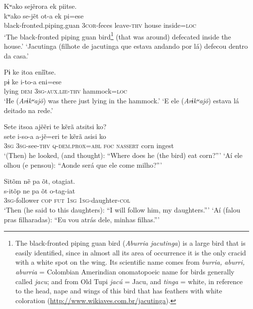 \documentclass[output=paper,
modfonts,nonflat
]{langsci/langscibook}
\begin{document}
 
\newpage
\ea Kʷako sejẽrora ek piitse.\\[.3em]
\gll kʷako se-jẽt ot-a ek pi=ese\\
     black-fronted.piping.guan \textsc{3cor}-feces leave-\textsc{thv} house inside=\textsc{loc}\\
\glt ‘The black-fronted piping guan bird\footnote{The black-fronted piping guan bird (\textit{Aburria jacutinga}) is a large bird that is easily identified, since in almost all its area of occurrence it is the only cracid with a white spot on the wing. Its scientific name comes from \textit{burria, aburri, aburria} = Colombian Amerindian onomatopoeic name for birds generally called \textit{jacu}; and from Old Tupi \textit{jacú} = Jacu, and \textit{tinga} = white, in reference to the head, nape and wings of this bird that has feathers with white coloration (\url{http://www.wikiaves.com.br/jacutinga}).} (that was around) defecated inside the house.’
\glt ‘Jacutinga (filhote de jacutinga que estava andando por lá) defecou dentro da casa.' 
\z 

 

\ea Pɨ ke itoa{\footnotemark} enĩĩtse.\\[.3em]
\gll pɨ ke i-to-a eni=ese\\
     lying \textsc{dem} \textsc{3sg-aux.lie-thv} hammock=\textsc{loc}\\
\glt ‘He (\textit{Arɨkʷajõ}) was there just lying in the hammock.’
\glt ‘E ele (\textit{Arɨkʷajõ}) estava lá deitado na rede.'
\z 

\ea Sete itsoa ajẽẽri te kẽrã atsitsi ko?\\[.3em]
\gll sete i-so-a a-jẽ=eri te kẽrã asisi ko\\
     \textsc{3sg} \textsc{3sg}-see-\textsc{thv} \textsc{q-dem.prox}=\textsc{abl} \textsc{foc} \textsc{nassert} corn ingest\\
\glt ‘(Then) he looked, (and thought): “Where does he (the bird) eat corn?”’
\glt  ‘Aí ele olhou (e pensou): “Aonde será que ele come milho?”' 
\z 

\ea Sitõm{\footnotemark} nẽ pa õt, otagiat.\\[.3em]
\gll s-itõp  ne pa õt o-tag-iat\\
     \textsc{3sg}-follower \textsc{cop} \textsc{fut} \textsc{1sg} \textsc{1sg}-daughter-\textsc{col}\\
\glt ‘Then (he said to this daughters): “I will follow him, my daughters.”’
\glt ‘Aí (falou pras filharadas): “Eu vou atrás dele, minhas filhas.”'
\z 
\end{document}

